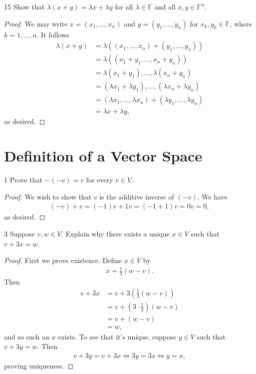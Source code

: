 \documentclass{extarticle}
\newenvironment{problem}[1]{\begin{prob*}{#1}{}}{\end{prob*}}
\newcommand{\F}{\mathbb{F}}
\begin{document}
\begin{problem}{15}
Show that $\lambda(x + y)=\lambda x +\lambda y$ for all $\lambda\in\F$ and all $x,y\in\F^n$.
\end{problem}
\begin{proof}
We may write $x = (x_1, \dots, x_n)$ and $y = (y_1,\dots,y_n)$ for $x_k,y_k\in\F$, where $k=1,\dots,n$.  It follows
\begin{align*}
\lambda(x+y) &= \lambda( (x_1,\dots,x_n) + (y_1,\dots,y_n) )\\
&= \lambda ( (x_1 + y_1, \dots, x_n + y_n) )\\
&= \lambda (x_1 + y_1), \dots, \lambda(x_n + y_n) \\
&= (\lambda x_1 + \lambda y_1), \dots, (\lambda x_n + \lambda y_n)\\
&= (\lambda x_1, \dots, \lambda x_n) + (\lambda y_1, \dots, \lambda y_n)\\
&= \lambda x + \lambda y,
\end{align*}
as desired.
\end{proof}


\section{Definition of a Vector Space}

\begin{problem}{1}
Prove that $-(-v)=v$ for every $v\in V$.
\end{problem}
\begin{proof}
We wish to show that $v$ is the additive inverse of $(-v)$.  We have
\begin{align*}
(-v) + v = (-1)v + 1v = (-1 + 1)v = 0v = 0,
\end{align*}
as desired.
\end{proof}

\begin{problem}{3}
Suppose $v,w\in V$.  Explain why there exists a unique $x\in V$ such that $v + 3x = w$.
\end{problem}
\begin{proof}
First we prove existence.  Define $x\in V$ by
\begin{align*}
x = \frac{1}{3}(w - v).
\end{align*}
Then
\begin{align*}
v + 3x &= v + 3\left( \frac{1}{3}(w - v)\right) \\
&= v + \left(3 \cdot \frac{1}{3}\right)(w-v)\\
&= v + (w - v)\\
&= w,
\end{align*}
and so such an $x$ exists.  To see that it's unique, suppose $y\in V$ such that $v + 3y = w$.  Then
\begin{align*}
v + 3y = v + 3x \iff 3y = 3x \iff y = x,
\end{align*}
proving uniqueness.
\end{proof}
\end{document}
